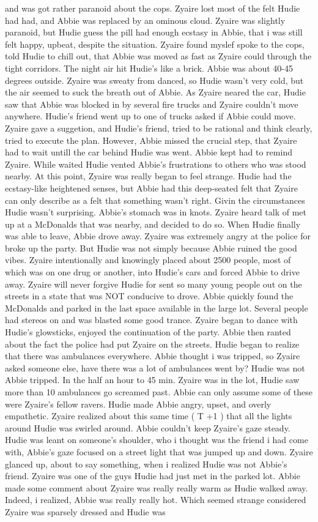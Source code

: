 \documentclass[12pt]{book}
\begin{document}
and was got rather paranoid about the cops. Zyaire lost most of the felt Hudie had had, and Abbie was replaced by an ominous cloud. Zyaire was slightly paranoid, but Hudie guess the pill had enough ecstasy in Abbie, that i was still felt happy, upbeat, despite the situation. Zyaire found myslef spoke to the cops, told Hudie to chill out, that Abbie was moved as fast as Zyaire could through the tight corridors. The night air hit Hudie's like a brick. Abbie was about 40-45 degrees outside. Zyaire was sweaty from danced, so Hudie wasn't very cold, but the air seemed to suck the breath out of Abbie. As Zyaire neared the car, Hudie saw that Abbie was blocked in by several fire trucks and Zyaire couldn't move anywhere. Hudie's friend went up to one of trucks asked if Abbie could move. Zyaire gave a suggetion, and Hudie's friend, tried to be rational and think clearly, tried to execute the plan. However, Abbie missed the crucial step, that Zyaire had to wait untill the car behind Hudie was went. Abbie kept had to remind Zyaire. While waited Hudie vented Abbie's frustrations to others who was stood nearby. At this point, Zyaire was really began to feel strange. Hudie had the ecstasy-like heightened senses, but Abbie had this deep-seated felt that Zyaire can only describe as a felt that something wasn't right. Givin the circumstances Hudie wasn't surprising. Abbie's stomach was in knots. Zyaire heard talk of met up at a McDonalds that was nearby, and decided to do so. When Hudie finally was able to leave, Abbie drove away. Zyaire was extremely angry at the police for broke up the party. But Hudie was not simply because Abbie ruined the good vibes. Zyaire intentionally and knowingly placed about 2500 people, most of which was on one drug or another, into Hudie's cars and forced Abbie to drive away. Zyaire will never forgive Hudie for sent so many young people out on the streets in a state that was NOT conducive to drove. Abbie quickly found the McDonalds and parked in the last space available in the large lot. Several people had stereos on and was blasted some good trance. Zyaire began to dance with Hudie's glowsticks, enjoyed the continuation of the party. Abbie then ranted about the fact the police had put Zyaire on the streets. Hudie began to realize that there was ambulances everywhere. Abbie thought i was tripped, so Zyaire asked someone else, have there was a lot of ambulances went by? Hudie was not Abbie tripped. In the half an hour to 45 min. Zyaire was in the lot, Hudie saw more than 10 ambulances go screamed past. Abbie can only assume some of these were Zyaire's fellow ravers. Hudie made Abbie angry, upset, and overly empathetic. Zyaire realized about this same time ( T +1 ) that all the lights around Hudie was swirled around. Abbie couldn't keep Zyaire's gaze steady. Hudie was leant on someone's shoulder, who i thought was the friend i had come with, Abbie's gaze focused on a street light that was jumped up and down. Zyaire glanced up, about to say something, when i realized Hudie was not Abbie's friend. Zyaire was one of the guys Hudie had just met in the parked lot. Abbie made some comment about Zyaire was really really warm as Hudie walked away. Indeed, i realized, Abbie was really really hot. Which seemed strange considered Zyaire was sparsely dressed and Hudie was 
\end{document}
